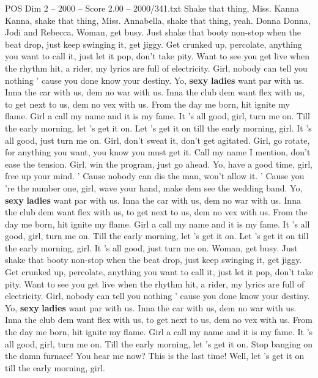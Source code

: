 \begin{textsample}{POS Dim 2 – 2000 – Score 2.00 – 2000/341.txt}  \label{ex:f2_pos_013}
Shake that thing, Miss.
Kanna Kanna, shake that thing, Miss.
Annabella, shake that thing, yeah.
Donna Donna, Jodi and Rebecca.
Woman, get busy.
Just shake that booty non-stop when the beat drop, just keep swinging it, get jiggy.
Get crunked up, percolate, anything you want to call it, just let it pop, don't take pity.
Want to see you get live when the rhythm hit, a rider, my lyrics are full of electricity.
Girl, nobody can tell you nothing ' cause you done know your destiny.
Yo, \textbf{sexy} \textbf{ladies} want par with us.
Inna the car with us, dem no war with us.
Inna the club dem want flex with us, to get next to us, dem no vex with us.
From the day me born, hit ignite my flame.
Girl a call my name and it is my fame.
It 's all good, girl, turn me on.
Till the early morning, let 's get it on.
Let 's get it on till the early morning, girl.
It 's all good, just turn me on.
Girl, don't sweat it, don't get agitated.
Girl, go rotate, for anything you want, you know you must get it.
Call my name I mention, don't ease the tension.
Girl, win the program, just go ahead.
Yo, have a good time, girl, free up your mind. ' Cause nobody can dis the man, won't allow it. ' Cause you 're the number one, girl, wave your hand, make dem see the wedding band.
Yo, \textbf{sexy} \textbf{ladies} want par with us.
Inna the car with us, dem no war with us.
Inna the club dem want flex with us, to get next to us, dem no vex with us.
From the day me born, hit ignite my flame.
Girl a call my name and it is my fame.
It 's all good, girl, turn me on.
Till the early morning, let 's get it on.
Let 's get it on till the early morning, girl.
It 's all good, just turn me on.
Woman, get busy.
Just shake that booty non-stop when the beat drop, just keep swinging it, get jiggy.
Get crunked up, percolate, anything you want to call it, just let it pop, don't take pity.
Want to see you get live when the rhythm hit, a rider, my lyrics are full of electricity.
Girl, nobody can tell you nothing ' cause you done know your destiny.
Yo, \textbf{sexy} \textbf{ladies} want par with us.
Inna the car with us, dem no war with us.
Inna the club dem want flex with us, to get next to us, dem no vex with us.
From the day me born, hit ignite my flame.
Girl a call my name and it is my fame.
It 's all good, girl, turn me on.
Till the early morning, let 's get it on.
Stop banging on the damn furnace!
You hear me now?
This is the last time!
Well, let 's get it on till the early morning, girl.

\end{textsample}
